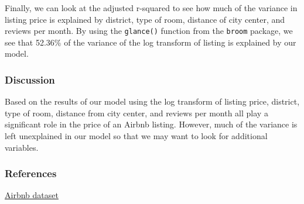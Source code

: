 \documentclass[]{article}
\begin{document}
Finally, we can look at the adjusted r-squared to see how much of the
variance in listing price is explained by district, type of room,
distance of city center, and reviews per month. By using the
\texttt{glance()} function from the \texttt{broom} package, we see that
52.36\% of the variance of the log transform of listing is explained by
our model.

\hypertarget{discussion}{%
\subsubsection{Discussion}\label{discussion}}

Based on the results of our model using the log transform of listing
price, district, type of room, distance from city center, and reviews
per month all play a significant role in the price of an Airbnb listing.
However, much of the variance is left unexplained in our model so that
we may want to look for additional variables.

\hypertarget{references}{%
\subsubsection{References}\label{references}}

\href{http://insideairbnb.com/get-the-data.html}{Airbnb dataset}
\end{document}

